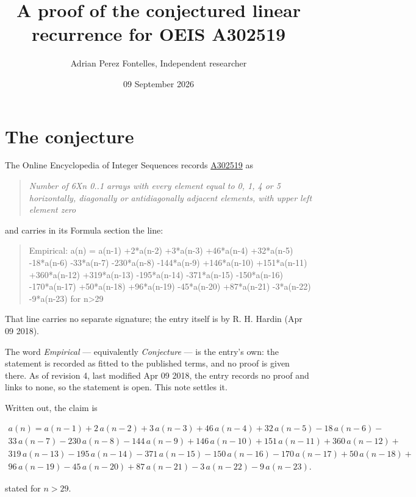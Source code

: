 \documentclass[11pt]{article}
\title{A proof of the conjectured linear recurrence for OEIS A302519}
\author{Adrian Perez Fontelles, Independent researcher}
\date{09 September 2026}
\theoremstyle{definition}
\begin{document}
\maketitle
\section{The conjecture}

The Online Encyclopedia of Integer Sequences records \href{https://oeis.org/A302519}{A302519} as

\begin{quote}\itshape Number of 6Xn 0..1 arrays with every element equal to 0, 1, 4 or 5 horizontally, diagonally or antidiagonally adjacent elements, with upper left element zero\end{quote}

and carries in its Formula section the line:

\begin{quote}\ttfamily Empirical: a(n) = a(n-1) +2*a(n-2) +3*a(n-3) +46*a(n-4) +32*a(n-5) -18*a(n-6) -33*a(n-7) -230*a(n-8) -144*a(n-9) +146*a(n-10) +151*a(n-11) +360*a(n-12) +319*a(n-13) -195*a(n-14) -371*a(n-15) -150*a(n-16) -170*a(n-17) +50*a(n-18) +96*a(n-19) -45*a(n-20) +87*a(n-21) -3*a(n-22) -9*a(n-23) for n>29\end{quote}

That line carries no separate signature; the entry itself is by R. H. Hardin (Apr 09 2018).

The word {\itshape Empirical} --- equivalently {\itshape Conjecture} --- is the entry's own: the statement is recorded as fitted to the published terms, and no proof is given there. As of revision 4, last modified Apr 09 2018, the entry records no proof and links to none, so the statement is open. This note settles it.

Written out, the claim is

\begin{multline*} a(n) = a(n-1) + 2\,a(n-2) + 3\,a(n-3) + 46\,a(n-4) + 32\,a(n-5) - 18\,a(n-6) - \\ 33\,a(n-7) - 230\,a(n-8) - 144\,a(n-9) + 146\,a(n-10) + 151\,a(n-11) + 360\,a(n-12) + \\ 319\,a(n-13) - 195\,a(n-14) - 371\,a(n-15) - 150\,a(n-16) - 170\,a(n-17) + 50\,a(n-18) + \\ 96\,a(n-19) - 45\,a(n-20) + 87\,a(n-21) - 3\,a(n-22) - 9\,a(n-23). \end{multline*}

stated for $n > 29$.
\end{document}
